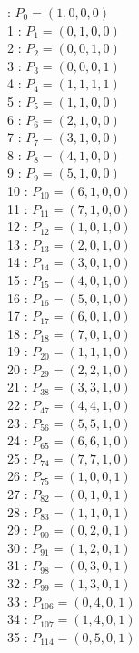 \documentclass{article}
\begin{document}
{\begin{multicols}{3}
 : $P_{0}=( 1, 0, 0, 0 )$\\
1 : $P_{1}=( 0, 1, 0, 0 )$\\
2 : $P_{2}=( 0, 0, 1, 0 )$\\
3 : $P_{3}=( 0, 0, 0, 1 )$\\
4 : $P_{4}=( 1, 1, 1, 1 )$\\
5 : $P_{5}=( 1, 1, 0, 0 )$\\
6 : $P_{6}=( 2, 1, 0, 0 )$\\
7 : $P_{7}=( 3, 1, 0, 0 )$\\
8 : $P_{8}=( 4, 1, 0, 0 )$\\
9 : $P_{9}=( 5, 1, 0, 0 )$\\
10 : $P_{10}=( 6, 1, 0, 0 )$\\
11 : $P_{11}=( 7, 1, 0, 0 )$\\
12 : $P_{12}=( 1, 0, 1, 0 )$\\
13 : $P_{13}=( 2, 0, 1, 0 )$\\
14 : $P_{14}=( 3, 0, 1, 0 )$\\
15 : $P_{15}=( 4, 0, 1, 0 )$\\
16 : $P_{16}=( 5, 0, 1, 0 )$\\
17 : $P_{17}=( 6, 0, 1, 0 )$\\
18 : $P_{18}=( 7, 0, 1, 0 )$\\
19 : $P_{20}=( 1, 1, 1, 0 )$\\
20 : $P_{29}=( 2, 2, 1, 0 )$\\
21 : $P_{38}=( 3, 3, 1, 0 )$\\
22 : $P_{47}=( 4, 4, 1, 0 )$\\
23 : $P_{56}=( 5, 5, 1, 0 )$\\
24 : $P_{65}=( 6, 6, 1, 0 )$\\
25 : $P_{74}=( 7, 7, 1, 0 )$\\
26 : $P_{75}=( 1, 0, 0, 1 )$\\
27 : $P_{82}=( 0, 1, 0, 1 )$\\
28 : $P_{83}=( 1, 1, 0, 1 )$\\
29 : $P_{90}=( 0, 2, 0, 1 )$\\
30 : $P_{91}=( 1, 2, 0, 1 )$\\
31 : $P_{98}=( 0, 3, 0, 1 )$\\
32 : $P_{99}=( 1, 3, 0, 1 )$\\
33 : $P_{106}=( 0, 4, 0, 1 )$\\
34 : $P_{107}=( 1, 4, 0, 1 )$\\
35 : $P_{114}=( 0, 5, 0, 1 )$\\

\end{multicols}}
\end{document}
